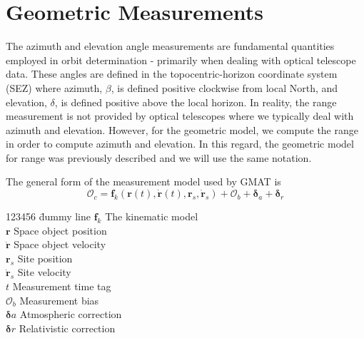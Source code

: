 \section{Geometric Measurements}

The azimuth and elevation angle measurements are fundamental
quantities employed in orbit determination - primarily when dealing
with optical telescope data.  These angles are defined in the
topocentric-horizon coordinate system (SEZ) where azimuth, $\beta$,
is defined positive clockwise from local North, and elevation,
$\delta$, is defined positive above the local horizon. In reality,
the range measurement is not provided by optical telescopes where we
typically deal with azimuth and elevation. However, for the
geometric model, we compute the range in  order to compute azimuth
and elevation. In this regard, the geometric model for range was
previously described and we will use the same notation.




The general form of the measurement model used by GMAT is
%
\begin{equation}
   \mathcal{O}_c = \mathbf{f}_k\left(\mathbf{r}(t), \dot{\mathbf{r}}(t),
   \mathbf{r}_s, \dot{\mathbf{r}}_s\right) +\mathcal{O}_b + \boldsymbol\delta_a + \boldsymbol\delta_r
\end{equation}
%
%
\begin{tabbing}[htbp!]
123456 \= dummy line \kill
$\mathbf{f}_k$ \> The kinematic model \\
$\mathbf{r}$ \> Space object position\\
$\dot{\mathbf{r}}$ \> Space object velocity\\
$\mathbf{r}_s$ \> Site position\\
$\dot{\mathbf{r}}_s$    \> Site velocity\\
$t$    \> Measurement time tag\\
$\mathcal{O}_b$    \> Measurement bias\\
$\boldsymbol\delta a$    \> Atmospheric correction\\
$\boldsymbol\delta r$     \> Relativistic correction\\
\end{tabbing}

